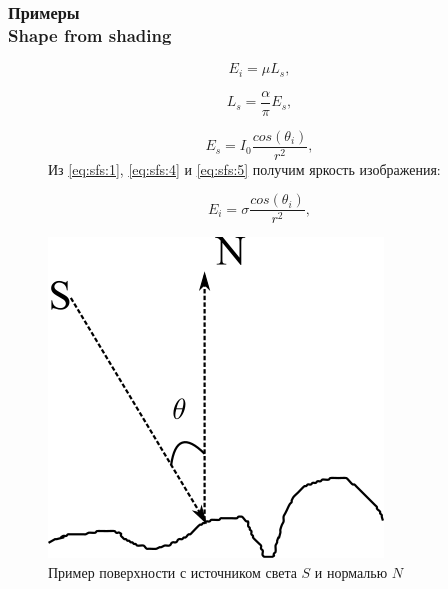 \documentclass[hyperref={unicode=true},professionalfont]{beamer}
\newcommand{\stamp}{
	\begin{frame}[plain,noframenumbering]
		\begin{table}[h!]
			\flushright
			\vspace{5cm}
			\begin{adjustbox}{max width=0.7\textwidth}
				\begin{tabular}{
					|>{\footnotesize}p{0.8cm}|
					>{\footnotesize}p{0.8cm}|
					>{\footnotesize}p{2.2cm}|
					>{\footnotesize}p{1.1cm}|
					>{\footnotesize}p{0.8cm}|
					>{\footnotesize}p{5cm}|
					>{\footnotesize}p{0.1cm}|
					>{\footnotesize}p{0.1cm}|
					>{\footnotesize}p{0.1cm}|
					>{\footnotesize}p{0.8cm}|
					>{\footnotesize}p{1.4cm}|
				}
					\hline
					&&&&& \multicolumn{6}{>{\footnotesize}c|}{\multirow{3}{*}{\Large 0.043.00.00 ПЗ}} \\ \cline{1-5}
					&&&&& \multicolumn{6}{>{\footnotesize}c|}{} \\ \cline{1-5}
					Изм. & Лист & № Документа & Подпись & Дата & \multicolumn{6}{>{\footnotesize}c|}{} \\ \hline
					\multicolumn{2}{|>{\footnotesize}l|}{Разработал}
                    & Апанович Д.В. &  &  &
                                            \multirow{4}{5cm}{\centering
                                            Параллельный алгоритм
                                            численного решения
                                            анизотропного уравнения эйконала} & \multicolumn{3}{>{\footnotesize}l|}{Лит.} & Лист & Листов \\ \cline{1-5}\cline{7-11}
					\multicolumn{2}{|>{\footnotesize}l|}{Проверил}
                    & Казаков А.Л. &  &  &  & У & & & \insertframenumber & \inserttotalframenumber \\ \cline{1-5}\cline{7-11}
					\multicolumn{2}{|>{\footnotesize}l|}{Нормоконтролер}
                    & Казаков А.Л. &  &  &  & \multicolumn{5}{>{\footnotesize}l|}{} \\ \cline{1-5}
					\multicolumn{2}{|>{\footnotesize}l|}{} &  &  &  &  & \multicolumn{5}{>{\footnotesize}l|}{Кафедра АС, гр. ИСТм-16-1} \\ \cline{1-5}
					\multicolumn{2}{|>{\footnotesize}l|}{Утвердил}
                    & Бахвалов С.В. &  &  &  & \multicolumn{5}{>{\footnotesize}l|}{} \\ \hline

				\end{tabular}
			\end{adjustbox}
		\end{table}

	\end{frame}
}
\renewcommand{\stamp}{}
\begin{document}
\begin{frame}
  \frametitle{Примеры \\ Shape from shading}

  \begin{figure}[ht]
    \begin{minipage}[h]{0.49\linewidth}
      \begin{equation}
        \label{eq:sfs:1}
        E_i=\mu L_s,
      \end{equation}

      \begin{equation}
        \label{eq:sfs:4}
        L_s=\frac{\alpha}{\pi}E_s,
      \end{equation}

      \begin{equation}
        \label{eq:sfs:5}
        E_s = I_0\frac{cos(\theta_i)}{r^2},
      \end{equation}
      Из \eqref{eq:sfs:1}, \eqref{eq:sfs:4} и \eqref{eq:sfs:5} получим
      яркость
      изображения:
      
      \begin{equation}
        \label{eq:sfs:6}
        E_i = \sigma\frac{cos(\theta_i)}{r^2},
      \end{equation}

    \end{minipage}
    \begin{minipage}[ht]{0.49\linewidth}
      \centering
      \includegraphics[width=0.9\linewidth]{sfs-explain.png}
      \hfil \caption{Пример поверхности с источником света $S$ и
        нормалью $N$}
      \label{fig:barier_surface}
    \end{minipage}
  \end{figure}

\end{frame}
\stamp
\end{document}
